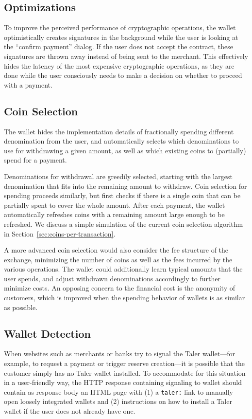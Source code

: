 \subsection{Optimizations}\label{sec:wallet-optimizations}
To improve the perceived performance of cryptographic operations,
the wallet optimistically creates signatures in the background
while the user is looking at the ``confirm payment'' dialog.  If the user does
not accept the contract, these signatures are thrown away instead of being sent
to the merchant.  This effectively hides the latency of the
most expensive cryptographic operations, as they are done while the user
consciously needs to make a decision on whether to proceed with a payment.


\subsection{Coin Selection}
The wallet hides the implementation details of fractionally spending different
denomination from the user, and automatically selects which denominations to
use for withdrawing a given amount, as well as which existing coins to
(partially) spend for a payment.

Denominations for withdrawal are greedily selected, starting with the largest
denomination that fits into the remaining amount to withdraw.  Coin selection
for spending proceeds similarly, but first checks if there is a single coin
that can be partially spent to cover the whole amount.  After each payment, the
wallet automatically refreshes coins with a remaining amount large enough to be
refreshed.  We discuss a simple simulation of the current coin selection algorithm
in Section~\ref{sec:coins-per-transaction}.

A more advanced coin selection would also consider the fee structure of the
exchange, minimizing the number of coins as well as the fees incurred by the
various operations.  The wallet could additionally learn typical amounts that
the user spends, and adjust withdrawn denominations accordingly to further
minimize costs.  An opposing concern to the financial cost is the anonymity of
customers, which is improved when the spending behavior of wallets is as
similar as possible.


\subsection{Wallet Detection}
When websites such as merchants or banks try to signal the Taler wallet---for example,
to request a payment or trigger reserve creation---it is possible that the
customer simply has no Taler wallet installed.  To accommodate for this situation in a
user-friendly way, the HTTP response containing signaling to wallet should
contain as response body an HTML page with (1) a \texttt{taler:} link to
manually open loosely integrated wallets and (2) instructions on how to install
a Taler wallet if the user does not already have one.

